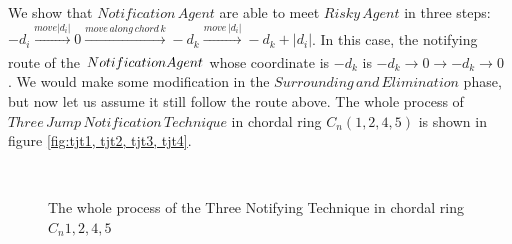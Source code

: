We show that $Notification\,Agent$ are able to meet $Risky\,Agent$ in three steps: $-d_i\xrightarrow[]{move\left | d_i \right |}0\xrightarrow[]{move\,along\,chord\,k}-d_k\xrightarrow[]{move\,\left | d_i \right |}-d_k+\left|d_i\right|$. In this case, the notifying route of the $Notification\,\\Agent$ whose coordinate is $-d_k$ is $-d_k{\rightarrow}0{\rightarrow}-d_k{\rightarrow}0$ . We would make some modification in the $Surrounding\,and\,Elimination$ phase, but now let us assume it still follow the route above. The whole process of $Three\,Jump\,Notification\, Technique$ in chordal ring $C_n(1, 2, 4, 5)$ is shown in figure \ref{fig:tjt1, tjt2, tjt3, tjt4}. 

\begin{figure} [H]
  \centering 
  \hspace{1in} 
   \
  \hspace{1in} 
  \hspace{1in} 
  \caption{The whole process of the Three Notifying Technique in chordal ring $C_n{1, 2, 4, 5}$} 
  \label{fig:subfig} %
\end{figure}

